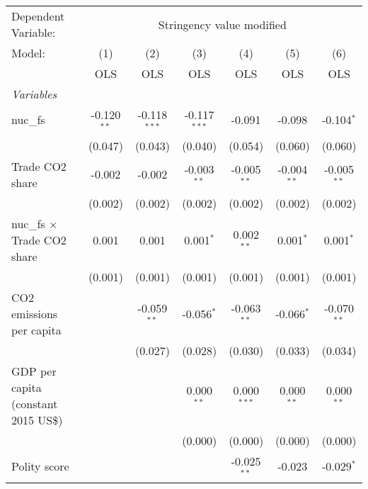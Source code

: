 
\begingroup
\centering
\begin{tabular}{lcccccc}
   \toprule
   Dependent Variable: & \multicolumn{6}{c}{Stringency value modified}\\
   Model:                               & (1)           & (2)            & (3)            & (4)           & (5)           & (6)\\  
                                        &  OLS          & OLS            & OLS            & OLS           & OLS           & OLS\\  
   \midrule
   \emph{Variables}\\
   nuc\_fs                              & -0.120$^{**}$ & -0.118$^{***}$ & -0.117$^{***}$ & -0.091        & -0.098        & -0.104$^{*}$\\   
                                        & (0.047)       & (0.043)        & (0.040)        & (0.054)       & (0.060)       & (0.060)\\   
   Trade CO2 share                      & -0.002        & -0.002         & -0.003$^{**}$  & -0.005$^{**}$ & -0.004$^{**}$ & -0.005$^{**}$\\   
                                        & (0.002)       & (0.002)        & (0.002)        & (0.002)       & (0.002)       & (0.002)\\   
   nuc\_fs $\times$ Trade CO2 share     & 0.001         & 0.001          & 0.001$^{*}$    & 0.002$^{**}$  & 0.001$^{*}$   & 0.001$^{*}$\\   
                                        & (0.001)       & (0.001)        & (0.001)        & (0.001)       & (0.001)       & (0.001)\\   
   CO2 emissions per capita             &               & -0.059$^{**}$  & -0.056$^{*}$   & -0.063$^{**}$ & -0.066$^{*}$  & -0.070$^{**}$\\   
                                        &               & (0.027)        & (0.028)        & (0.030)       & (0.033)       & (0.034)\\   
   GDP per capita (constant 2015 US\$)  &               &                & 0.000$^{**}$   & 0.000$^{***}$ & 0.000$^{**}$  & 0.000$^{**}$\\   
                                        &               &                & (0.000)        & (0.000)       & (0.000)       & (0.000)\\   
   Polity score                         &               &                &                & -0.025$^{**}$ & -0.023        & -0.029$^{*}$\\   

\end{tabular}
